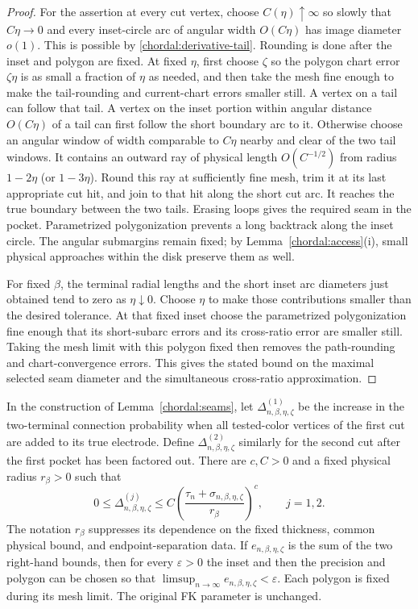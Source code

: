 \begin{proof}
For the assertion at every cut vertex, choose $C(\eta)\uparrow\infty$
so slowly that $C\eta\to0$ and every inset-circle arc of angular
width $O(C\eta)$ has image diameter $o(1)$.  This is possible by
\eqref{chordal:derivative-tail}.  Rounding is done after the inset
and polygon are fixed.  At fixed $\eta$, first choose $\zeta$ so
the polygon chart error $\zeta\eta$ is as small a fraction of
$\eta$ as needed, and then take the mesh fine enough to make the
tail-rounding and current-chart errors smaller still.  A vertex on
a tail can follow that tail.  A vertex on
the inset portion within angular distance $O(C\eta)$ of a tail can
first follow the short boundary arc to it.  Otherwise choose an
angular window of width comparable to $C\eta$ nearby and clear of
the two tail windows.  It contains an outward ray of physical
length $O(C^{-1/2})$ from radius $1-2\eta$ (or $1-3\eta$).
Round this ray at sufficiently fine mesh, trim it at its last
appropriate cut hit, and join to that hit along the short cut arc.
It reaches the true boundary between the two tails.  Erasing loops
gives the required seam in the pocket.  Parametrized polygonization
prevents a long backtrack along the inset circle.  The angular
submargins remain fixed; by Lemma~\ref{chordal:access}(i), small
physical approaches within the disk preserve them as well.

For fixed $\beta$, the terminal radial lengths and the short inset
arc diameters just obtained tend to zero as $\eta\downarrow0$.
Choose $\eta$ to make those contributions smaller than the desired
tolerance.  At that fixed inset choose the parametrized polygonization
fine enough that its short-subarc errors and its cross-ratio error
are smaller still.  Taking the mesh limit with this polygon fixed
then removes the path-rounding and chart-convergence errors.  This
gives the stated bound on the maximal selected seam diameter and
the simultaneous cross-ratio approximation.
\end{proof}

\begin{lemma}
\label{chordal:electrode-update}
In the construction of Lemma~\ref{chordal:seams}, let
$\Delta^{(1)}_{n,\beta,\eta,\zeta}$ be the increase in the
two-terminal connection probability when all tested-color vertices
of the first cut are added to its true electrode.  Define
$\Delta^{(2)}_{n,\beta,\eta,\zeta}$ similarly for the second cut
after the first pocket has been factored out.  There are $c,C>0$
and a fixed physical radius $r_\beta>0$ such that
\[
 0\le \Delta^{(j)}_{n,\beta,\eta,\zeta}
 \le C\left(
   \frac{\tau_n+\sigma_{n,\beta,\eta,\zeta}}{r_\beta}
       \right)^c,\qquad j=1,2.
\]
The notation $r_\beta$ suppresses its dependence on the fixed
thickness, common physical bound, and endpoint-separation data.
If $e_{n,\beta,\eta,\zeta}$ is the sum of the two right-hand bounds,
then for every $\varepsilon>0$ the inset and then the precision and
polygon can be chosen so that
$\limsup_{n\to\infty}e_{n,\beta,\eta,\zeta}<\varepsilon$.
Each polygon is fixed during its mesh limit.  The original FK
parameter is unchanged.
\end{lemma}

